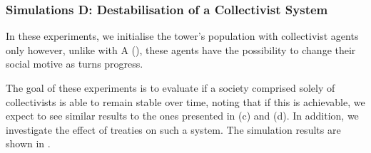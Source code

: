 



\subsubsection{Simulations D: Destabilisation of a Collectivist System}

In these experiments, we initialise the tower's population with collectivist agents only however, unlike with A (), these agents have the possibility to change their social motive as turns progress. 

The goal of these experiments is to evaluate if a society comprised solely of collectivists is able to remain stable over time, noting that if this is achievable, we expect to see similar results to the ones presented in  (c) and (d). In addition, we investigate the effect of treaties on such a system. The simulation results are shown in .

